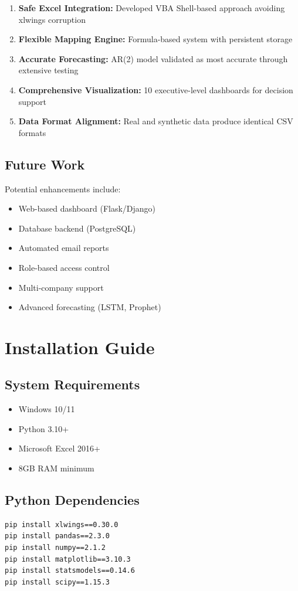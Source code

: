\documentclass[12pt,a4paper]{report}
\begin{document}
\begin{enumerate}
    \item \textbf{Safe Excel Integration:} Developed VBA Shell-based approach avoiding xlwings corruption
    \item \textbf{Flexible Mapping Engine:} Formula-based system with persistent storage
    \item \textbf{Accurate Forecasting:} AR(2) model validated as most accurate through extensive testing
    \item \textbf{Comprehensive Visualization:} 10 executive-level dashboards for decision support
    \item \textbf{Data Format Alignment:} Real and synthetic data produce identical CSV formats
\end{enumerate}

\section*{Future Work}

Potential enhancements include:
\begin{itemize}
    \item Web-based dashboard (Flask/Django)
    \item Database backend (PostgreSQL)
    \item Automated email reports
    \item Role-based access control
    \item Multi-company support
    \item Advanced forecasting (LSTM, Prophet)
\end{itemize}

\appendix
\chapter{Installation Guide}

\section{System Requirements}
\begin{itemize}
    \item Windows 10/11
    \item Python 3.10+
    \item Microsoft Excel 2016+
    \item 8GB RAM minimum
\end{itemize}

\section{Python Dependencies}
\begin{lstlisting}[style=pythonstyle]
pip install xlwings==0.30.0
pip install pandas==2.3.0
pip install numpy==2.1.2
pip install matplotlib==3.10.3
pip install statsmodels==0.14.6
pip install scipy==1.15.3
\end{lstlisting}
\end{document}
